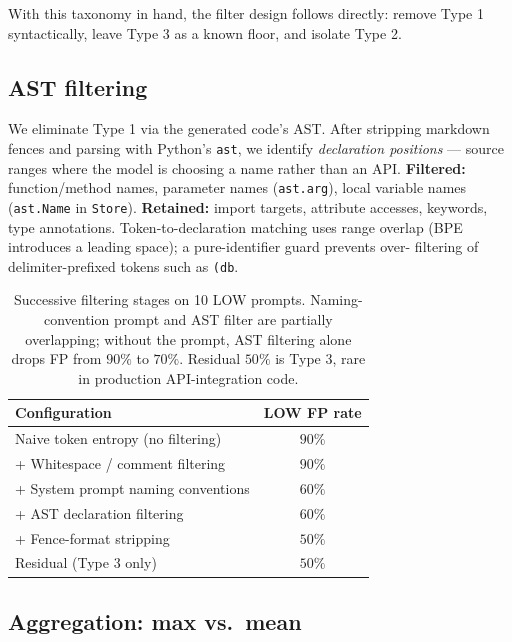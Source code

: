 With this taxonomy in hand, the filter design follows directly: remove
Type 1 syntactically, leave Type 3 as a known floor, and isolate Type 2.

\subsection{AST filtering}
\label{subsec:ast}

We eliminate Type 1 via the generated code's AST. After stripping
markdown fences and parsing with Python's \texttt{ast}, we identify
\emph{declaration positions} --- source ranges where the model is
choosing a name rather than an API.
\textbf{Filtered:} function/method names, parameter names
(\texttt{ast.arg}), local variable names (\texttt{ast.Name} in
\texttt{Store}).
\textbf{Retained:} import targets, attribute accesses, keywords, type
annotations. Token-to-declaration matching uses range overlap (BPE
introduces a leading space); a pure-identifier guard prevents over-%
filtering of delimiter-prefixed tokens such as \texttt{(db}.

\begin{table}[h]
\centering
\small
\begin{tabular}{lc}
\toprule
\textbf{Configuration} & \textbf{LOW FP rate} \\
\midrule
Naive token entropy (no filtering)                & $90\%$ \\
+ Whitespace / comment filtering                   & $90\%$ \\
+ System prompt naming conventions                 & $60\%$ \\
+ AST declaration filtering                        & $60\%$ \\
+ Fence-format stripping                           & $50\%$ \\
\midrule
Residual (Type 3 only)                             & $50\%$ \\
\bottomrule
\end{tabular}
\caption{Successive filtering stages on 10 LOW prompts. Naming-%
convention prompt and AST filter are partially overlapping; without
the prompt, AST filtering alone drops FP from $90\%$ to $70\%$.
Residual $50\%$ is Type 3, rare in production API-integration code.}
\label{tab:filtering}
\end{table}

\subsection{Aggregation: max vs.\ mean}
\label{subsec:aggregation}

